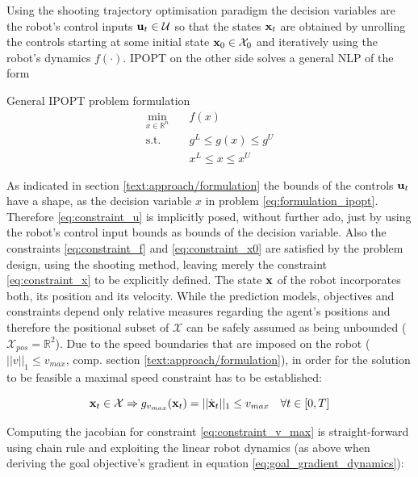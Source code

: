 Using the shooting trajectory optimisation paradigm the decision variables are the robot's control inputs  $\mathbf{u}_t \in \mathcal{U}$ so that the states $\mathbf{x}_t$ are obtained by unrolling the controls starting at some initial state $\mathbf{x}_0 \in \mathcal{X}_0$ and iteratively using the robot's dynamics $f(\cdot)$. \ac{IPOPT} on the other side solves a general \ac{NLP} of the form \cite{Wachter2006} \\

\begin{problem}{General IPOPT problem formulation}
\begin{align}
\min_{x \in \mathbb{R}^n} \quad & f(x) \\
\textrm{s.t. } \quad & g^L \leq g(x) \leq g^U \\
& x^L \leq x \leq x^U 
\end{align}
\label{eq:formulation_ipopt}
\end{problem}

As indicated in section \ref{text:approach/formulation} the bounds of the controls $\mathbf{u}_t$ have a shape, as the decision variable $x$ in problem \ref{eq:formulation_ipopt}. Therefore \ref{eq:constraint_u} is implicitly posed, without further ado, just by using the robot's control input bounds as bounds of the decision variable. Also the constraints \ref{eq:constraint_f} and  \ref{eq:constraint_x0} are satisfied by the problem design, using the shooting method, leaving merely the constraint \ref{eq:constraint_x} to be explicitly defined. The state $\mathbf{x}$ of the robot incorporates both, its position and its velocity. While the prediction models, objectives and constraints depend only  relative measures regarding the agent's positions and therefore the positional subset of $\mathcal{X}$ can be safely assumed as being unbounded ($\mathcal{X}_{pos} = \mathbb{R}^2$). Due to the speed boundaries that are imposed on the robot ($||v||_1 \leq v_{max}$, comp. section \ref{text:approach/formulation}), in order for the solution to be feasible a maximal speed constraint has to be established:

\begin{equation}
\mathbf{x}_t \in \mathcal{X} \Rightarrow g_{v_{max}}(\mathbf{x}_t) = ||\dot{\mathbf{x}}_t||_1 \leq v_{max} \quad \forall t \in [0, T]
\label{eq:constraint_v_max}
\end{equation}

Computing the jacobian for constraint \ref{eq:constraint_v_max} is straight-forward using chain rule and exploiting the linear robot dynamics (as above when deriving the goal objective's gradient in equation \ref{eq:goal_gradient_dynamics}):  

